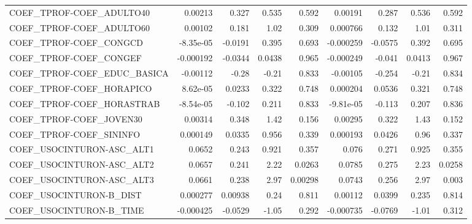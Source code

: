 \begin{tabular}{lrrrrrrrr}
COEF\_TPROF-COEF\_ADULTO40          &     0.00213 &        0.327 &   0.535 &    0.592 &    0.00191 &       0.287 &        0.536 &         0.592 \\
COEF\_TPROF-COEF\_ADULTO60          &     0.00102 &        0.181 &    1.02 &    0.309 &   0.000766 &       0.132 &         1.01 &         0.311 \\
COEF\_TPROF-COEF\_CONGCD            &   -8.35e-05 &      -0.0191 &   0.395 &    0.693 &  -0.000259 &     -0.0575 &        0.392 &         0.695 \\
COEF\_TPROF-COEF\_CONGEF            &   -0.000192 &      -0.0344 &  0.0438 &    0.965 &  -0.000249 &      -0.041 &       0.0413 &         0.967 \\
COEF\_TPROF-COEF\_EDUC\_BASICA       &    -0.00112 &        -0.28 &   -0.21 &    0.833 &   -0.00105 &      -0.254 &        -0.21 &         0.834 \\
COEF\_TPROF-COEF\_HORAPICO          &    8.62e-05 &       0.0233 &   0.322 &    0.748 &   0.000204 &      0.0536 &        0.321 &         0.748 \\
COEF\_TPROF-COEF\_HORASTRAB         &   -8.54e-05 &       -0.102 &   0.211 &    0.833 &  -9.81e-05 &      -0.113 &        0.207 &         0.836 \\
COEF\_TPROF-COEF\_JOVEN30           &     0.00314 &        0.348 &    1.42 &    0.156 &    0.00295 &       0.322 &         1.43 &         0.152 \\
COEF\_TPROF-COEF\_SININFO           &    0.000149 &       0.0335 &   0.956 &    0.339 &   0.000193 &      0.0426 &         0.96 &         0.337 \\
COEF\_USOCINTURON-ASC\_ALT1         &      0.0652 &        0.243 &   0.921 &    0.357 &      0.076 &       0.271 &        0.925 &         0.355 \\
COEF\_USOCINTURON-ASC\_ALT2         &      0.0657 &        0.241 &    2.22 &   0.0263 &     0.0785 &       0.275 &         2.23 &        0.0258 \\
COEF\_USOCINTURON-ASC\_ALT3         &      0.0661 &        0.238 &    2.97 &  0.00298 &     0.0743 &       0.256 &         2.97 &         0.003 \\
COEF\_USOCINTURON-B\_DIST           &    0.000277 &      0.00938 &    0.24 &    0.811 &    0.00112 &      0.0399 &        0.235 &         0.814 \\
COEF\_USOCINTURON-B\_TIME           &   -0.000425 &      -0.0529 &   -1.05 &    0.292 &  -0.000735 &     -0.0769 &        -1.01 &         0.312 \\

\end{tabular}
